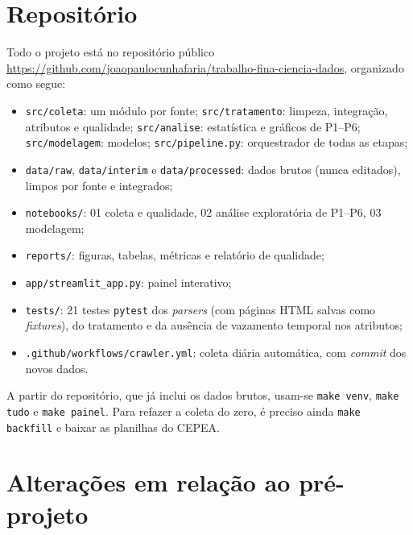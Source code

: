 \documentclass[conference]{IEEEtran}
\begin{document}
\FloatBarrier
\section{Repositório}

Todo o projeto está no repositório público
\url{https://github.com/joaopaulocunhafaria/trabalho-fina-ciencia-dados}, organizado como segue:
\begin{itemize}\raggedright
  \item \texttt{src/coleta}: um módulo por fonte; \texttt{src/tratamento}: limpeza, integração, atributos
  e qualidade; \texttt{src/analise}: estatística e gráficos de P1--P6; \texttt{src/modelagem}: modelos;
  \texttt{src/pipeline.py}: orquestrador de todas as etapas;
  \item \texttt{data/raw}, \texttt{data/interim} e \texttt{data/processed}: dados brutos (nunca editados),
  limpos por fonte e integrados;
  \item \texttt{notebooks/}: 01 coleta e qualidade, 02 análise exploratória de P1--P6, 03 modelagem;
  \item \texttt{reports/}: figuras, tabelas, métricas e relatório de qualidade;
  \item \texttt{app/streamlit\_app.py}: painel interativo;
  \item \texttt{tests/}: 21 testes \texttt{pytest} dos \emph{parsers} (com páginas HTML salvas como
  \emph{fixtures}), do tratamento e da ausência de vazamento temporal nos atributos;
  \item \texttt{.github/workflows/crawler.yml}: coleta diária automática, com \emph{commit} dos novos dados.
\end{itemize}
A partir do repositório, que já inclui os dados brutos, usam-se \texttt{make venv}, \texttt{make tudo} e \texttt{make painel}. Para refazer a coleta do zero, é preciso ainda \texttt{make backfill} e baixar as planilhas do CEPEA.

\section{Alterações em relação ao pré-projeto}
\end{document}
